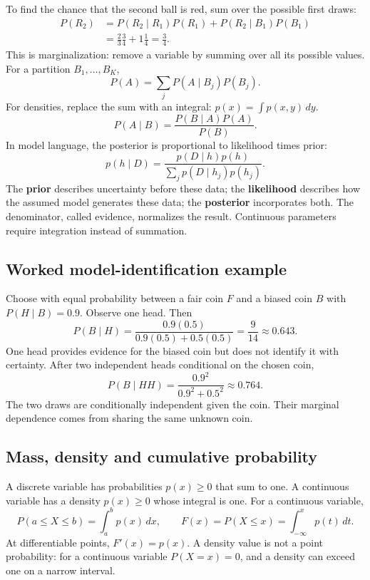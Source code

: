 \documentclass[11pt]{article}
\begin{document}
To find the chance that the second ball is red, sum over the possible first draws:
\begin{align*}
P(R_2)&=P(R_2\mid R_1)P(R_1)+P(R_2\mid B_1)P(B_1)\\
&=\frac23\frac34+1\frac14=\frac34.
\end{align*}
This is marginalization: remove a variable by summing over all its possible values. For a partition $B_1,\ldots,B_K$,
\[
P(A)=\sum_jP(A\mid B_j)P(B_j).
\]
For densities, replace the sum with an integral: $p(x)=\int p(x,y)\,dy$.
\[
P(A\mid B)=\frac{P(B\mid A)P(A)}{P(B)}.
\]
In model language, the posterior is proportional to likelihood times prior:
\[
p(h\mid D)=\frac{p(D\mid h)p(h)}{\sum_jp(D\mid h_j)p(h_j)}.
\]
The \textbf{prior} describes uncertainty before these data; the \textbf{likelihood} describes how the assumed model generates these data; the \textbf{posterior} incorporates both. The denominator, called evidence, normalizes the result. Continuous parameters require integration instead of summation.
\subsection{Worked model-identification example}
Choose with equal probability between a fair coin $F$ and a biased coin $B$ with $P(H\mid B)=0.9$. Observe one head. Then
\[
P(B\mid H)=\frac{0.9(0.5)}{0.9(0.5)+0.5(0.5)}=\frac9{14}\approx0.643.
\]
One head provides evidence for the biased coin but does not identify it with certainty. After two independent heads conditional on the chosen coin,
\[
P(B\mid HH)=\frac{0.9^2}{0.9^2+0.5^2}\approx0.764.
\]
The two draws are conditionally independent given the coin. Their marginal dependence comes from sharing the same unknown coin.
\subsection{Mass, density and cumulative probability}
A discrete variable has probabilities $p(x)\geq0$ that sum to one. A continuous variable has a density $p(x)\geq0$ whose integral is one. For a continuous variable,
\[
P(a\leq X\leq b)=\int_a^b p(x)\,dx,\qquad
F(x)=P(X\leq x)=\int_{-\infty}^{x}p(t)\,dt.
\]
At differentiable points, $F'(x)=p(x)$. A density value is not a point probability: for a continuous variable $P(X=x)=0$, and a density can exceed one on a narrow interval.
\end{document}
